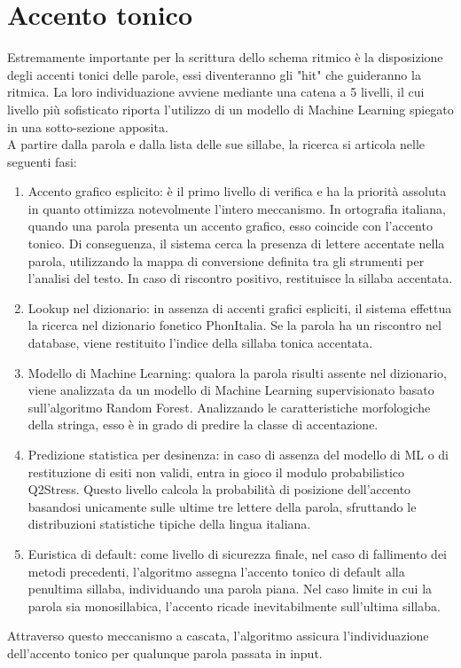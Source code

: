 \section{Accento tonico}
Estremamente importante per la scrittura dello schema ritmico è la disposizione degli accenti tonici delle parole, essi  diventeranno gli "hit" che 
guideranno la ritmica. La loro individuazione avviene mediante una catena a 5 livelli, il cui livello più sofisticato riporta l'utilizzo di un 
modello di Machine Learning spiegato in una sotto-sezione apposita.\\
A partire dalla parola e dalla lista delle sue sillabe, la ricerca si articola nelle seguenti fasi:
\begin{enumerate}
      \item Accento grafico esplicito: è il primo livello di verifica e ha la priorità assoluta in quanto ottimizza notevolmente l'intero meccanismo. 
      In ortografia italiana, quando una parola presenta un accento grafico, esso coincide con l'accento tonico. Di conseguenza, il sistema cerca 
      la presenza di lettere accentate nella parola, utilizzando la mappa di conversione definita tra gli strumenti per l'analisi del testo. 
      In caso di riscontro positivo, restituisce la sillaba accentata.
      \item Lookup nel dizionario: in assenza di accenti grafici espliciti, il sistema effettua la ricerca nel dizionario fonetico PhonItalia. 
      Se la parola ha un riscontro nel database, viene restituito l'indice della sillaba tonica accentata.
      \item Modello di Machine Learning: qualora la parola risulti assente nel dizionario, viene analizzata da un modello di Machine Learning supervisionato 
      basato sull'algoritmo Random Forest. Analizzando le caratteristiche morfologiche della stringa, esso è in grado di predire la classe di accentazione.
      \item Predizione statistica per desinenza: in caso di assenza del modello di ML o di restituzione di esiti non validi, entra in gioco il modulo 
      probabilistico Q2Stress. Questo livello calcola la probabilità di posizione dell'accento basandosi unicamente sulle ultime tre lettere della parola, 
      sfruttando le distribuzioni statistiche tipiche della lingua italiana. 
      \item Euristica di default: come livello di sicurezza finale, nel caso di fallimento dei metodi precedenti, l'algoritmo assegna l'accento tonico di 
      default alla penultima sillaba, individuando una parola piana. Nel caso limite in cui la parola sia monosillabica, l'accento ricade inevitabilmente 
      sull'ultima sillaba.
\end{enumerate} 
Attraverso questo meccanismo a cascata, l'algoritmo assicura l'individuazione dell'accento tonico per qualunque parola passata in input.


